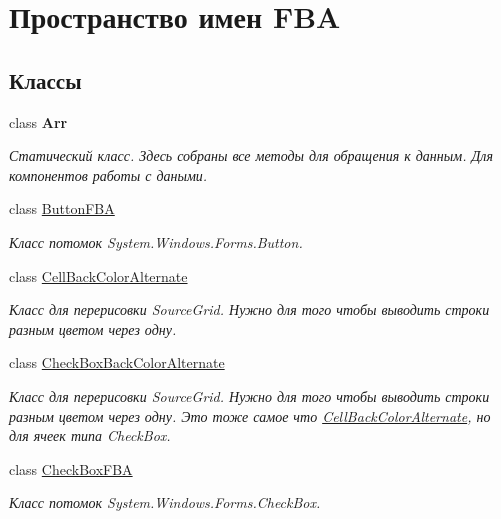 \hypertarget{namespace_f_b_a}{}\section{Пространство имен F\+BA}
\label{namespace_f_b_a}
\subsection*{Классы}
\begin{DoxyCompactItemize}
\item 
class {\bfseries Arr}
\begin{DoxyCompactList}\small\item\em Статический класс. Здесь собраны все методы для обращения к данным. Для компонентов работы с даными. \end{DoxyCompactList}\item 
class \mbox{\hyperlink{class_f_b_a_1_1_button_f_b_a}{Button\+F\+BA}}
\begin{DoxyCompactList}\small\item\em Класс потомок System.\+Windows.\+Forms.\+Button. \end{DoxyCompactList}\item 
class \mbox{\hyperlink{class_f_b_a_1_1_cell_back_color_alternate}{Cell\+Back\+Color\+Alternate}}
\begin{DoxyCompactList}\small\item\em Класс для перерисовки Source\+Grid. Нужно для того чтобы выводить строки разным цветом через одну. \end{DoxyCompactList}\item 
class \mbox{\hyperlink{class_f_b_a_1_1_check_box_back_color_alternate}{Check\+Box\+Back\+Color\+Alternate}}
\begin{DoxyCompactList}\small\item\em Класс для перерисовки Source\+Grid. Нужно для того чтобы выводить строки разным цветом через одну. Это тоже самое что \mbox{\hyperlink{class_f_b_a_1_1_cell_back_color_alternate}{Cell\+Back\+Color\+Alternate}}, но для ячеек типа Check\+Box. \end{DoxyCompactList}\item 
class \mbox{\hyperlink{class_f_b_a_1_1_check_box_f_b_a}{Check\+Box\+F\+BA}}
\begin{DoxyCompactList}\small\item\em Класс потомок System.\+Windows.\+Forms.\+Check\+Box. \end{DoxyCompactList}\item 

\end{DoxyCompactItemize}
